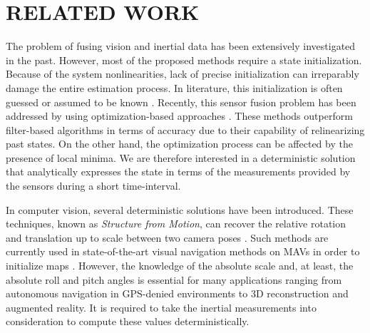 \documentclass[letterpaper, 10 pt, conference]{ieeeconf}  %
\begin{document}
\section{RELATED WORK}

The problem of fusing vision and inertial data has been extensively investigated in the past.
However, most of the proposed methods require a state initialization.
Because of the system nonlinearities, lack of precise initialization can irreparably damage the entire estimation process.
In literature, this initialization is often guessed or assumed to be known \cite{Armesto2007}\cite{Li2013}\cite{Huang2009}\cite{Bibuli2007}\cite{Forster2014}. Recently, this sensor fusion problem has been addressed by using optimization-based approaches \cite{Leute2014}\cite{Forster2015}\cite{mourikis2008dual}\cite{lupton2012visual}\cite{huang2011observability}\cite{mourikis2007multi}\cite{leutenegger2013keyframe}. These methods outperform filter-based algorithms in terms of accuracy due to their capability of relinearizing past states. On the other hand, the optimization process can be affected by the presence of local minima.
We are therefore interested in a deterministic solution that analytically expresses the state in terms of the measurements provided by the sensors during a short time-interval.

In computer vision, several deterministic solutions have been introduced.
These techniques, known as {\it Structure from Motion}, can recover the relative rotation and translation up to scale between two camera poses \cite{Longuet-Higgins1981}\cite{Hartley1997}\cite{Nister2003}\cite{Hartley2004}\cite{Li2006}.
Such methods are currently used in state-of-the-art visual navigation methods on MAVs in order to initialize maps \cite{Weiss2012}\cite{Forster2014}.
However, the knowledge of the absolute scale and, at least, the absolute roll and pitch angles is essential for many applications ranging from autonomous navigation in GPS-denied environments to 3D reconstruction and augmented reality.
It is required to take the inertial measurements into consideration to compute these values deterministically.

\end{document}

